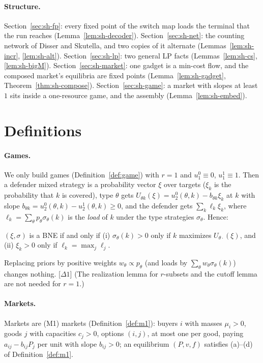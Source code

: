 {\sloppy\paragraph{Structure.} Section~\ref{sec:sh-fp}: every fixed point of the switch map loads the terminal
that the run reaches (Lemma~\ref{lem:sh-decoder}). Section~\ref{sec:sh-net}: the counting network of
Disser and Skutella, and two copies of it alternate (Lemmas~\ref{lem:sh-incr}, \ref{lem:sh-alt}). Section~\ref{sec:sh-lp}:
two general LP facts (Lemmas~\ref{lem:sh-cs}, \ref{lem:sh-bigM}). Section~\ref{sec:sh-market}: one
gadget is a min-cost flow, and the composed market's equilibria are fixed points
(Lemma~\ref{lem:sh-gadget}, Theorem~\ref{thm:sh-compose}). Section~\ref{sec:sh-game}: a market with
slopes at least $1$ sits inside a one-resource game, and the assembly (Lemma~\ref{lem:sh-embed}).\par}

\section{Definitions}\label{sec:sh-def}

\paragraph{Games.} We only build games (Definition~\ref{def:game}) with $r=1$ and $u_1^0\equiv0$,
$u_1^1\equiv1$. Then a defender mixed strategy is a probability vector $\xi$ over targets ($\xi_k$ is the
probability that $k$ is covered), type $\theta$ gets $U_{\theta k}(\xi)=u_2^0(\theta,k)-b_{\theta
k}\xi_k$ at $k$ with slope $b_{\theta k}=u_2^0(\theta,k)-u_2^1(\theta,k)\ge0$, and the defender gets
$\sum_k\ell_k\xi_k$, where $\ell_k=\sum_\theta p_\theta\sigma_\theta(k)$ is the \emph{load} of $k$ under
the type strategies $\sigma_\theta$. Hence:

\begin{fact}\label{fact:sh-br}
\statuslean
$(\xi,\sigma)$ is a BNE if and only if (i) $\sigma_\theta(k)>0$ only if $k$ maximizes
$U_{\theta\cdot}(\xi)$, and (ii) $\xi_k>0$ only if $\ell_k=\max_j\ell_j$.
\end{fact}

Replacing priors by positive weights $w_\theta\propto p_\theta$ (and loads by
$\sum_\theta w_\theta\sigma_\theta(k)$) changes nothing. [$\Delta1$] (The realization lemma for
$r$-subsets and the cutoff lemma are not needed for $r=1$.)

\paragraph{Markets.} Markets are (M1) markets (Definition~\ref{def:m1}): buyers $i$ with masses
$\mu_i>0$, goods $j$ with capacities $c_j>0$, options $(i,j)$, at most one per good, paying
$a_{ij}-b_{ij}P_j$ per unit with slope $b_{ij}>0$; an equilibrium $(P,v,f)$ satisfies (a)--(d) of
Definition~\ref{def:m1}.

